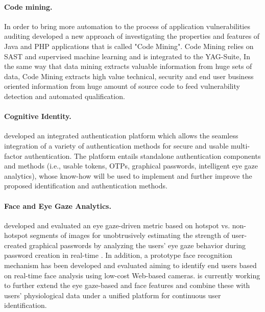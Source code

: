\documentclass[a4paper,11pt]{article}
\begin{document}
\paragraph{\YAGshort{} Code mining.}

In order to bring more automation to the process of application vulnerabilities auditing \YAGshort{} developed a new approach of investigating the properties and features of Java and PHP applications that is called "Code Mining". Code Mining relies on SAST and supervised machine learning and is integrated to the YAG-Suite, In the same way that data mining extracts valuable information from huge sets of data, Code Mining extracts high value technical, security and end user business oriented information from huge amount of source code to feed vulnerability detection and automated qualification.

\paragraph{\COGNIshort{} Cognitive Identity.}

\COGNIshort{} developed an integrated authentication platform which allows the seamless integration of a variety of authentication methods for secure and usable multi-factor authentication. The platform entails standalone authentication components and methods (i.e., usable tokens, OTPs, graphical passwords, intelligent eye gaze analytics), whose know-how will be used to implement and further improve the proposed identification and authentication methods.

\paragraph{\COGNIshort{} Face and Eye Gaze Analytics.}

\COGNIshort{} developed and evaluated an eye gaze-driven metric based on hotspot vs. non-hotspot segments of images for unobtrusively estimating the strength of user-created graphical passwords by analyzing the users' eye gaze behavior during password creation in real-time \cite{10.1145/3377325.3377537, 10.1145/3379336.3381460, 10.1145/3320435.3320474}. In addition, a prototype face recognition mechanism has been developed and evaluated aiming to identify end users based on real-time face analysis using low-cost Web-based cameras. \COGNIshort{} is currently working to further extend the eye gaze-based and face features and combine these with users' physiological data under a unified platform for continuous user identification.
\end{document}
